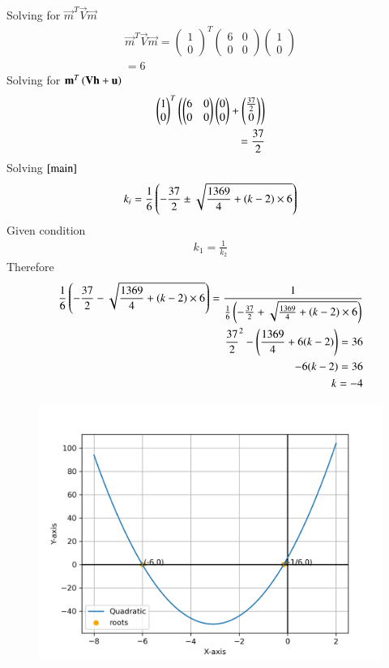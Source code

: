 \documentclass[a5paper,10pt]{article}
\begin{document}
Solving for $\vec{m}^T\vec{V}\vec{m}$
\begin{align}
    \vec{m}^T\vec{V}\vec{m}=\begin{pmatrix}1 \\0\end{pmatrix}^T\begin{pmatrix}6&0\\0&0\end{pmatrix}\begin{pmatrix}1 \\ 0\end{pmatrix}\\
    =6\label{mv}
\end{align}
Solving for $\mathbf{m}^T\left(\mathbf{V}\mathbf{h}+\mathbf{u}\right)$
\begin{align}
    \begin{pmatrix}1 \\ 0\end{pmatrix}^T\left(\begin{pmatrix}6&0\\0&0\end{pmatrix}\begin{pmatrix}0\\0\end{pmatrix}+\begin{pmatrix}\frac{37}{2}\\0\end{pmatrix}\right)\\
    =\frac{37}{2}
\end{align}
Solving $\eqref{main}$
\begin{align}
    k_i=\frac{1}{6}\left(-\frac{37}{2} \pm \sqrt{\frac{1369}{4} +(k-2)\times 6}\right)
\end{align}
Given condition
\begin{align}
    k_1=\frac{1}{k_2}
\end{align}
Therefore
\begin{align}
    \frac{1}{6}\left(-\frac{37}{2} - \sqrt{\frac{1369}{4} +(k-2)\times 6}\right)=\frac{1}{\frac{1}{6}\left(-\frac{37}{2} + \sqrt{\frac{1369}{4} +(k-2)\times 6}\right)}\\
    \frac{37}{2}^2-\left(\frac{1369}{4}+6(k-2)\right)=36\\
    -6(k-2)=36\\
    k=-4
\end{align}
\begin{figure}[H]
    \centering
    \includegraphics[width=\columnwidth]{figs/figure.png}
    \caption{}
    \label{fig:placeholder}
\end{figure}
\end{document}
